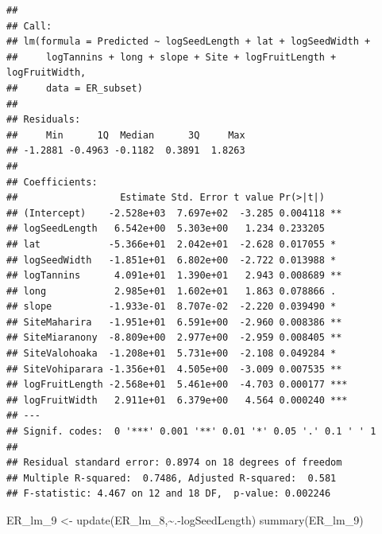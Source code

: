 \documentclass[
  12pt,
]{article}
\newenvironment{Shaded}{\begin{snugshade}}{\end{snugshade}}
\newcommand{\FunctionTok}[1]{\textcolor[rgb]{0.00,0.00,0.00}{#1}}
\newcommand{\NormalTok}[1]{#1}
\newcommand{\OtherTok}[1]{\textcolor[rgb]{0.56,0.35,0.01}{#1}}
\newcommand{\SpecialCharTok}[1]{\textcolor[rgb]{0.00,0.00,0.00}{#1}}
\begin{document}
\begin{verbatim}
## 
## Call:
## lm(formula = Predicted ~ logSeedLength + lat + logSeedWidth + 
##     logTannins + long + slope + Site + logFruitLength + logFruitWidth, 
##     data = ER_subset)
## 
## Residuals:
##     Min      1Q  Median      3Q     Max 
## -1.2881 -0.4963 -0.1182  0.3891  1.8263 
## 
## Coefficients:
##                  Estimate Std. Error t value Pr(>|t|)    
## (Intercept)    -2.528e+03  7.697e+02  -3.285 0.004118 ** 
## logSeedLength   6.542e+00  5.303e+00   1.234 0.233205    
## lat            -5.366e+01  2.042e+01  -2.628 0.017055 *  
## logSeedWidth   -1.851e+01  6.802e+00  -2.722 0.013988 *  
## logTannins      4.091e+01  1.390e+01   2.943 0.008689 ** 
## long            2.985e+01  1.602e+01   1.863 0.078866 .  
## slope          -1.933e-01  8.707e-02  -2.220 0.039490 *  
## SiteMaharira   -1.951e+01  6.591e+00  -2.960 0.008386 ** 
## SiteMiaranony  -8.809e+00  2.977e+00  -2.959 0.008405 ** 
## SiteValohoaka  -1.208e+01  5.731e+00  -2.108 0.049284 *  
## SiteVohiparara -1.356e+01  4.505e+00  -3.009 0.007535 ** 
## logFruitLength -2.568e+01  5.461e+00  -4.703 0.000177 ***
## logFruitWidth   2.911e+01  6.379e+00   4.564 0.000240 ***
## ---
## Signif. codes:  0 '***' 0.001 '**' 0.01 '*' 0.05 '.' 0.1 ' ' 1
## 
## Residual standard error: 0.8974 on 18 degrees of freedom
## Multiple R-squared:  0.7486, Adjusted R-squared:  0.581 
## F-statistic: 4.467 on 12 and 18 DF,  p-value: 0.002246
\end{verbatim}

\begin{Shaded}
\begin{Highlighting}[]
\NormalTok{ER\_lm\_9 }\OtherTok{\textless{}{-}} \FunctionTok{update}\NormalTok{(ER\_lm\_8,}\SpecialCharTok{\textasciitilde{}}\NormalTok{.}\SpecialCharTok{{-}}\NormalTok{logSeedLength)}
\FunctionTok{summary}\NormalTok{(ER\_lm\_9)}
\end{Highlighting}
\end{Shaded}
\end{document}
